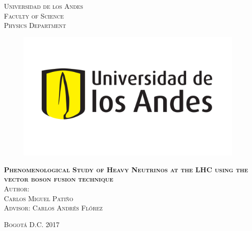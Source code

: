 \documentclass[11pt, oneside]{book}
\begin{document}
\begin{titlepage}
\begin{center}

\textsc{\Large Universidad de los Andes}\\[3em]

\textsc{\large Faculty of Science}\\[1em]

\textsc{\large Physics Department} \\[1em]

\begin{figure}[H]
\begin{center}
\includegraphics[scale = 0.4]{logo-uniandes.png}
\end{center}
\end{figure}

\vspace{0.5em}

\textsc{\huge \textbf{Phenomenological Study of Heavy Neutrinos at the LHC using the vector boson fusion technique}}\\[4em]





\textsc{Author:}\\[1em]

\textsc{\Large Carlos Miguel Patiño}\\[1em]

\textsc{\large Advisor: Carlos Andrés Flórez}

\end{center}

\vspace*{\fill}
\textsc{Bogotá D.C. \hspace*{\fill} 2017}

\end{titlepage}
\end{document}
